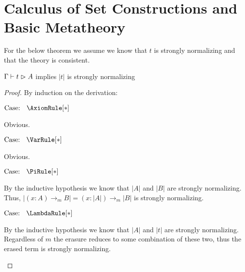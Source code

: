 \chapter{Calculus of Set Constructions and Basic Metatheory}




For the below theorem we assume we know that $t$ is strongly normalizing and that the theory is consistent.

\begin{theorem}
    $\Gamma \vdash t \vartriangleright A$ implies $|t|$ is strongly normalizing
\end{theorem}
\begin{proof}
    By induction on the derivation:

    $\text{Case: }\begin{array}{c} \AxiomRule[*] \end{array}$
    \begin{proofcase}
        Obvious.
    \end{proofcase}

    $\text{Case: }\begin{array}{c} \VarRule[*] \end{array}$
    \begin{proofcase}
        Obvious.
    \end{proofcase}

    $\text{Case: }\begin{array}{c} \PiRule[*] \end{array}$
    \begin{proofcase}
        By the inductive hypothesis we know that $|A|$ and $|B|$ are strongly normalizing.
        Thus, $|(x : A) \to_m B| = (x : |A|) \to_m |B|$ is strongly normalizing.
    \end{proofcase}

    $\text{Case: }\begin{array}{c} \LambdaRule[*] \end{array}$
    \begin{proofcase}
        By the inductive hypothesis we know that $|A|$ and $|t|$ are strongly normalizing.
        Regardless of $m$ the erasure reduces to some combination of these two, thus the erased term is strongly normalizing.
    \end{proofcase}


\end{proof}
